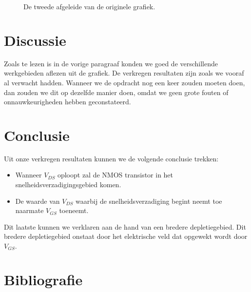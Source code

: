 \documentclass{scrartcl}  %
\begin{document}
\begin{figure}[H]
\centering
	\setlength{} 
	\setlength{}
	
	\caption{De tweede afgeleide van de originele grafiek.}
	\label{fig:Id-2nd-div}
\end{figure}

\section{Discussie}
Zoals te lezen is in de vorige paragraaf konden we goed de verschillende werkgebieden aflezen uit de grafiek. 
De verkregen resultaten zijn zoals we vooraf al verwacht hadden. 
Wanneer we de opdracht nog een keer zouden moeten doen, dan zouden we dit op dezelfde manier doen, omdat we geen grote fouten of onnauwkeurigheden hebben geconstateerd. 

\section{Conclusie}
Uit onze verkregen resultaten kunnen we de volgende conclusie trekken: 
\begin{itemize}
	\item Wanneer $V_{DS}$ oploopt zal de NMOS transistor in het snelheidsverzadigingsgebied komen.
	\item De waarde van $V_{DS}$ waarbij de snelheidsverzadiging begint neemt toe naarmate $V_{GS}$ toeneemt.
\end{itemize}
Dit laatste kunnen we verklaren aan de hand van een bredere depletiegebied. 
Dit bredere depletiegebied onstaat door het elektrische veld dat opgewekt wordt door $V_{GS}$.

\newpage
{}
\section{Bibliografie}
\printbibliography
\end{document}
